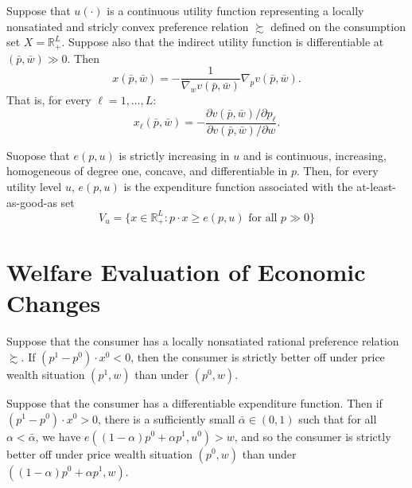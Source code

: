\begin{prop}
    Suppose that $u(\cdot)$ is a continuous utility function representing a locally nonsatiated and stricly convex preference relation $\succsim$ defined on the consumption set $X = \mathbb{R}^L_+$. Suppose also that the indirect utility function is differentiable at $(\bar{p}, \bar{w}) \gg 0$. Then
    \begin{equation*}
        x(\bar{p}, \bar{w}) = - \frac{1}{\nabla_w v(\bar{p}, \bar{w})} \nabla_p v(\bar{p}, \bar{w}).
    \end{equation*}
    That is, for every $\ell = 1, \dots, L$:
    \begin{equation*}
        x_\ell (\bar{p}, \bar{w}) = - \frac{\partial v(\bar{p}, \bar{w}) / \partial p_\ell}{\partial v(\bar{p}, \bar{w}) / \partial w}.
    \end{equation*}
\end{prop}

\begin{prop}
    Suopose that $e(p, u)$ is strictly increasing in $u$ and is continuous, increasing, homogeneous of degree one, concave, and differentiable in $p$. Then, for every utility level $u$, $e(p, u)$ is the expenditure function associated with the at-least-as-good-as set
    \begin{equation*}
        V_u = \{x \in \mathbb{R}^L_+ : p \cdot x \geq e(p, u) \text{ for all } p \gg 0\}
    \end{equation*}
\end{prop}


\section{Welfare Evaluation of Economic Changes}

\begin{prop}
    Suppose that the consumer has a locally nonsatiated rational preference relation $\succsim$. If $(p^1 - p^0) \cdot x^0 < 0$, then the consumer is strictly better off under price wealth situation $(p^1, w)$ than under $(p^0, w)$.
\end{prop}

\begin{prop}
    Suppose that the consumer has a differentiable expenditure function. Then if $(p^1 - p^0) \cdot x^0 > 0$, there is a sufficiently small $\bar{\alpha} \in (0, 1)$ such that for all $\alpha < \bar{\alpha}$, we have $e((1 - \alpha) p^0 + \alpha p^1, u^0) > w$, and so the consumer is strictly better off under price wealth situation $(p^0, w)$ than under $((1 - \alpha) p^0 + \alpha p^1, w)$.
\end{prop}

